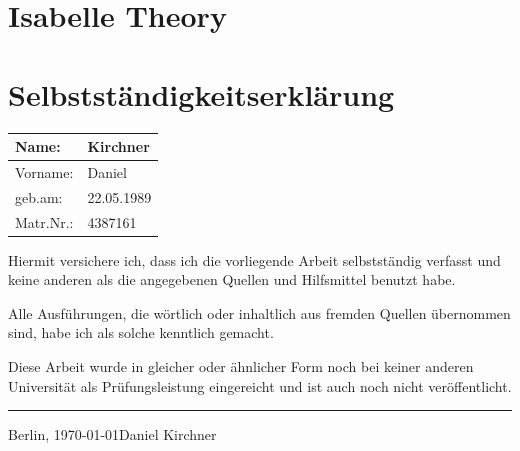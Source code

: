 \documentclass[a4paper,enabledeprecatedfontcommands,abstract=on,twoside=true]{scrreprt}
\numberwithin{TODO}{chapter}
\numberwithin{equation}{section}
\begin{document}



\appendix
\setcounter{secnumdepth}{3}
\chapter{Isabelle Theory}














\restoregeometry




\cleardoublepage

\chapter*{Selbstst\"andigkeitserkl\"arung}

\begin{center}
\setlength\extrarowheight{4pt}
\begin{tabularx}{\textwidth}{|X|X|}
\hline
Name: & Kirchner \\
\hline
Vorname: & Daniel \\
\hline
geb.am: & 22.05.1989 \\
\hline
Matr.Nr.: & 4387161 \\
\hline
\end{tabularx}
\end{center}

Hiermit versichere ich, dass ich die vorliegende Arbeit selbstst\"andig
verfasst und keine anderen als die angegebenen Quellen und Hilfsmittel
benutzt habe.

Alle Ausf\"uhrungen, die w\"ortlich oder inhaltlich aus fremden Quellen
\"ubernommen sind, habe ich als solche kenntlich gemacht.

Diese Arbeit wurde in gleicher oder \"ahnlicher Form noch bei keiner
anderen Universit\"at als Pr\"ufungsleistung eingereicht und ist auch
noch nicht ver\"offentlicht.

\vspace{50pt}
\noindent\hfill\rule{5cm}{.4pt}\par
\noindent Berlin, \today   \hfill Daniel Kirchner
\end{document}
